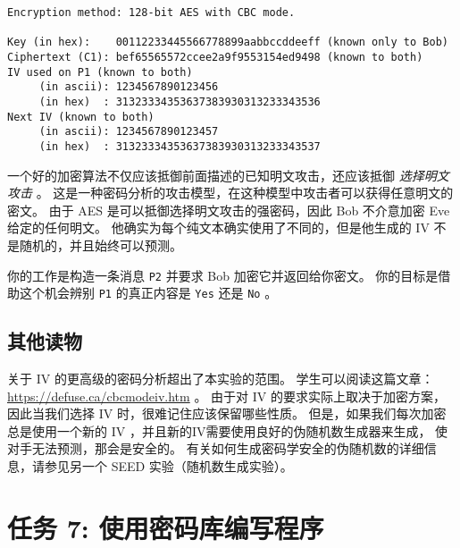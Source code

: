 \begin{lstlisting}
Encryption method: 128-bit AES with CBC mode.

Key (in hex):    00112233445566778899aabbccddeeff (known only to Bob)
Ciphertext (C1): bef65565572ccee2a9f9553154ed9498 (known to both)
IV used on P1 (known to both)
     (in ascii): 1234567890123456
     (in hex)  : 31323334353637383930313233343536
Next IV (known to both)
     (in ascii): 1234567890123457
     (in hex)  : 31323334353637383930313233343537
\end{lstlisting}


一个好的加密算法不仅应该抵御前面描述的已知明文攻击，还应该抵御 \textit{选择明文攻击} 。
这是一种密码分析的攻击模型，在这种模型中攻击者可以获得任意明文的密文。
由于 AES 是可以抵御选择明文攻击的强密码，因此 Bob 不介意加密 Eve 给定的任何明文。
他确实为每个纯文本确实使用了不同的，但是他生成的 IV 不是随机的，并且始终可以预测。


你的工作是构造一条消息 \texttt{P2} 并要求 Bob 加密它并返回给你密文。
你的目标是借助这个机会辨别 \texttt{P1} 的真正内容是 \texttt{Yes} 还是 \texttt{No} 。






\subsection{其他读物}

关于 IV 的更高级的密码分析超出了本实验的范围。
学生可以阅读这篇文章： \url{https://defuse.ca/cbcmodeiv.htm} 。
由于对 IV 的要求实际上取决于加密方案，因此当我们选择 IV 时，很难记住应该保留哪些性质。
但是，如果我们每次加密总是使用一个新的 IV ，并且新的IV需要使用良好的伪随机数生成器来生成，
使对手无法预测，那会是安全的。
有关如何生成密码学安全的伪随机数的详细信息，请参见另一个 SEED 实验（随机数生成实验）。



\section{任务 7: 使用密码库编写程序}

